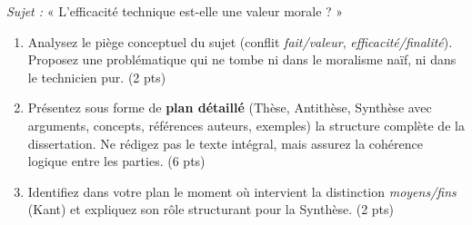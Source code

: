 \documentclass[11pt]{article}
\begin{document}
\begin{exercice}
\textit{Sujet :} « L'efficacité technique est-elle une valeur morale ? »
\begin{enumerate}
    \item Analysez le piège conceptuel du sujet (conflit \textit{fait/valeur}, \textit{efficacité/finalité}). Proposez une problématique qui ne tombe ni dans le moralisme naïf, ni dans le technicien pur. (2 pts)
    \item Présentez sous forme de \textbf{plan détaillé} (Thèse, Antithèse, Synthèse avec arguments, concepts, références auteurs, exemples) la structure complète de la dissertation. Ne rédigez pas le texte intégral, mais assurez la cohérence logique entre les parties. (6 pts)
    \item Identifiez dans votre plan le moment où intervient la distinction \textit{moyens/fins} (Kant) et expliquez son rôle structurant pour la Synthèse. (2 pts)
\end{enumerate}
\end{exercice}
\end{document}
